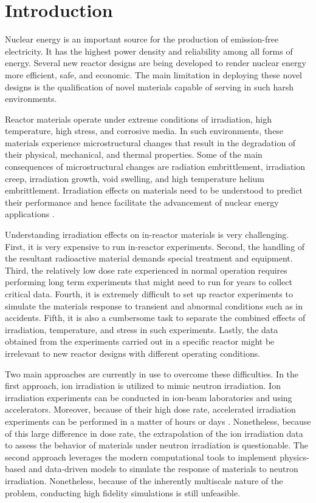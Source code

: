 \documentclass[utf8]{frontiersSCNS} %
\begin{document}
\clearpage
\section{Introduction}

Nuclear energy is an important source for the production of emission-free electricity. It has the highest power density and reliability among all forms of energy. Several new reactor designs are being developed to render nuclear energy more efficient, safe, and economic. The main limitation in deploying these novel designs is the qualification of novel materials capable of serving in such harsh environments.

Reactor materials operate under extreme conditions of irradiation, high temperature, high stress, and corrosive media. In such environments, these materials experience microstructural changes that result in the degradation of their physical, mechanical, and thermal properties. Some of the main consequences of microstructural changes are radiation embrittlement, irradiation creep, irradiation growth, void swelling, and high temperature helium embrittlement. Irradiation effects on materials need to be understood to predict their performance and hence facilitate the advancement of nuclear energy applications \citep{Vanderlaan2012,English2003,ryabikovskaya2021,yingling2021}.

Understanding irradiation effects on in-reactor materials is very challenging. First, it is very expensive to run in-reactor experiments. Second, the handling of the resultant radioactive material demands special treatment and equipment. Third, the relatively low dose rate experienced in normal operation requires performing long term experiments that might need to run for years to collect critical data. Fourth, it is extremely difficult to set up reactor experiments to simulate the materials response to transient and abnormal conditions such as in accidents. Fifth, it is also a cumbersome task to separate the combined effects of irradiation, temperature, and stress in such experiments. Lastly, the data obtained from the experiments carried out in a specific reactor might be irrelevant to new reactor designs with different operating conditions.

Two main approaches are currently in use to overcome these difficulties. In the first approach, ion irradiation is utilized to mimic neutron irradiation. Ion irradiation experiments can be conducted in ion-beam laboratories and using accelerators. Moreover, because of their high dose rate, accelerated irradiation experiments can be performed in a matter of hours or days \citep{shao2017, sun2017, krasheninnikov2010, was2014, zhang2018}. Nonetheless, because of this large difference in dose rate, the extrapolation of the ion irradiation data to assess the behavior of materials under neutron irradiation is questionable. The second approach leverages the modern computational tools to implement physics-based and data-driven models to simulate the response of materials to neutron irradiation. Nonetheless, because of the inherently multiscale nature of the problem, conducting high fidelity simulations is still unfeasible. 
\end{document}
